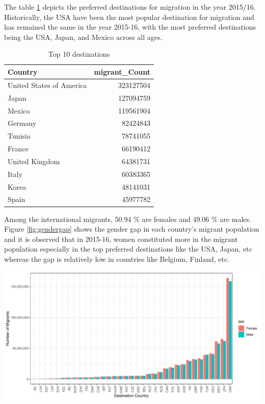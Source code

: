 \documentclass[11pt,a4paper,]{article}
\let\origfigure\figure
\let\endorigfigure\endfigure
\renewenvironment{figure}[1][2] {
    \expandafter\origfigure\expandafter[H]
} {
    \endorigfigure
}%
\begin{document}
The table \ref{tab:topdestinations} depicts the preferred destinations for migration in the year 2015/16. Historically, the USA have been the most popular destination for migration and has remained the same in the year 2015-16, with the most preferred destinations being the USA, Japan, and Mexico across all ages.

\begin{table}

\caption{\label{tab:topdestinations}Top 10 destinations}
\centering
\begin{tabular}[t]{lr}
\toprule
Country & migrant\_Count\\
\midrule
\rowcolor{gray!6}  United States of America & 323127504\\
Japan & 127094759\\
\rowcolor{gray!6}  Mexico & 119561904\\
Germany & 82424843\\
\rowcolor{gray!6}  Tunisia & 78741055\\
\addlinespace
France & 66190412\\
\rowcolor{gray!6}  United Kingdom & 64381731\\
Italy & 60383365\\
\rowcolor{gray!6}  Korea & 48141031\\
Spain & 45977782\\
\bottomrule
\end{tabular}
\end{table}

Among the international migrants, 50.94 \% are females and 49.06 \% are males. Figure \ref{fig:gendergap} shows the gender gap in each country's migrant population and it is observed that in 2015-16, women constituted more in the migrant population especially in the top preferred destinations like the USA, Japan, etc whereas the gap is relatively low in countries like Belgium, Finland, etc.

\begin{figure}
\centering
\includegraphics{ETC5513assignment4_files/figure-latex/gendergap-1.pdf}
\caption{\label{fig:gendergap}Gender difference in migrant population in countries}
\end{figure}
\end{document}
